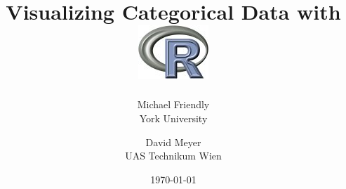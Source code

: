 %
\title{%
\Huge{Visualizing Categorical Data with }
\includegraphics[height=2ex, keepaspectratio]{front/fig/Rlogo}
%
%
}
\author{
	{\Large Michael Friendly} \\ York University
	\and
	{\Large David Meyer} \\ UAS Technikum Wien
}
\date{\today}
\vspace{1cm}
\maketitle
